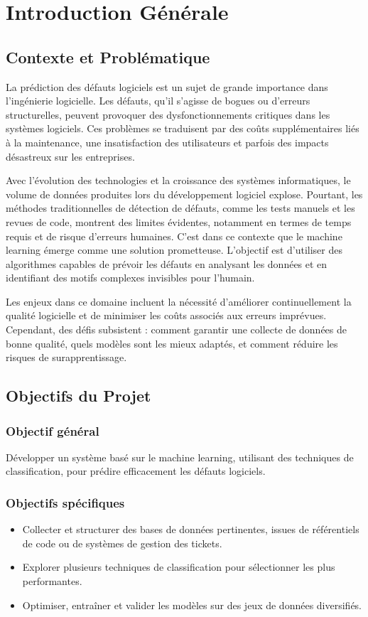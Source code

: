 \chapter*{Introduction Générale}

\section{Contexte et Problématique}
\label{sec:contexte}
La prédiction des défauts logiciels est un sujet de grande importance dans l’ingénierie logicielle. Les défauts, qu’il s’agisse de bogues ou d’erreurs structurelles, peuvent provoquer des dysfonctionnements critiques dans les systèmes logiciels. Ces problèmes se traduisent par des coûts supplémentaires liés à la maintenance, une insatisfaction des utilisateurs et parfois des impacts désastreux sur les entreprises.

Avec l’évolution des technologies et la croissance des systèmes informatiques, le volume de données produites lors du développement logiciel explose. Pourtant, les méthodes traditionnelles de détection de défauts, comme les tests manuels et les revues de code, montrent des limites évidentes, notamment en termes de temps requis et de risque d’erreurs humaines. C’est dans ce contexte que le machine learning émerge comme une solution prometteuse. L’objectif est d’utiliser des algorithmes capables de prévoir les défauts en analysant les données et en identifiant des motifs complexes invisibles pour l’humain.

Les enjeux dans ce domaine incluent la nécessité d’améliorer continuellement la qualité logicielle et de minimiser les coûts associés aux erreurs imprévues. Cependant, des défis subsistent : comment garantir une collecte de données de bonne qualité, quels modèles sont les mieux adaptés, et comment réduire les risques de surapprentissage.

\section{Objectifs du Projet}
\label{sec:objectifs}
\subsection{Objectif général}
Développer un système basé sur le machine learning, utilisant des techniques de classification, pour prédire efficacement les défauts logiciels.

\subsection{Objectifs spécifiques}
\begin{itemize}
    \item Collecter et structurer des bases de données pertinentes, issues de référentiels de code ou de systèmes de gestion des tickets.
    \item Explorer plusieurs techniques de classification pour sélectionner les plus performantes.
    \item Optimiser, entraîner et valider les modèles sur des jeux de données diversifiés.
\end{itemize}